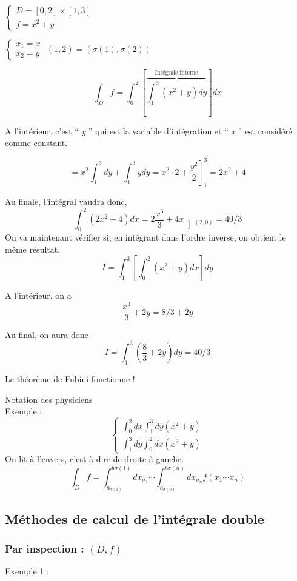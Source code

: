 $ \left\{
\begin{array}{l}
D = [0,2]\times[1,3]\\
f = x^2+y
\end{array}
\right.
$

$
 \left\{
\begin{array}{l}
x_1=x\\
x_2=y
\end{array}
\right.
$
$(1,2)=(\sigma(1),\sigma(2))$

\[\int_D f = \int_0^2 \left[ \overbrace{\int_1^3 (x^2+y) dy}^{\text{Intégrale interne}}\right] dx\]

A l'intérieur, c'est `` \textit{y} '' qui est la variable d'intégration et `` \textit{x} '' est considéré comme constant.

\[=x^2\int_1^3 dy+\int _1^3 y dy = x^2 \cdot 2+\left.\frac{y^2}{2}\right]_1^3 = 2x^2+4\]

Au finale, l'intégral vaudra donc,
\[  \int_0^2(2x^2+4)dx = 2\frac{x^3}{3}+4x \left]_{(2,0)} \right.= 40/3\]
On va maintenant vérifier si, en intégrant dans l'ordre inverse, on obtient le même résultat.
\[I = \int_1^3 \left[ \int_0^2 (x^2+y)dx \right] dy\]

A l'intérieur, on a \[\frac{x^3}{3}+2y = 8/3 + 2y\]

Au final, on aura donc \[I = \int_1^3(\frac{8}{3}+2y)dy = 40/3\]

Le théorème de Fubini fonctionne !

\begin{myrem}
Notation des physiciens\\
Exemple :
$$\left\{
\begin{array}{l}
\int_0^2dx\int_1^3dy (x^2+y)\\
\int_1^3dy\int_0^2 dx ( x^2+y)
\end{array}
\right.
$$
On lit à l'envers, c'est-à-dire de droite à gauche.
\[\int_D f = \int_{a_{\sigma(1)}}^{b{\sigma(1)}} dx_{\sigma_1} \cdots \int_{a_{\sigma(n)}}^{b{\sigma(n)}} dx_{\sigma_n} f(x_1 \cdots x_n)\]

\end{myrem}

\subsection{Méthodes de calcul de l'intégrale double}
\subsubsection{Par inspection : $(D,f)$}
Exemple 1 :

